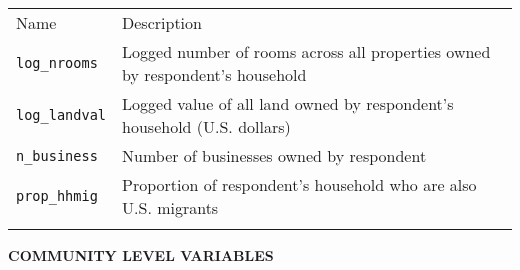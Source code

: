 \documentclass[]{article}
\begin{document}
\begin{longtable}[c]{@{}ll@{}}
\toprule\addlinespace
\begin{minipage}[b]{0.39\columnwidth}\raggedright
Name
\end{minipage} & \begin{minipage}[b]{0.54\columnwidth}\raggedright
Description
\end{minipage}
\\\addlinespace
\midrule\endhead
\begin{minipage}[t]{0.39\columnwidth}\raggedright
\texttt{log\_nrooms}
\end{minipage} & \begin{minipage}[t]{0.54\columnwidth}\raggedright
Logged number of rooms across all properties owned by respondent's
household
\end{minipage}
\\\addlinespace
\begin{minipage}[t]{0.39\columnwidth}\raggedright
\texttt{log\_landval}
\end{minipage} & \begin{minipage}[t]{0.54\columnwidth}\raggedright
Logged value of all land owned by respondent's household (U.S. dollars)
\end{minipage}
\\\addlinespace
\begin{minipage}[t]{0.39\columnwidth}\raggedright
\texttt{n\_business}
\end{minipage} & \begin{minipage}[t]{0.54\columnwidth}\raggedright
Number of businesses owned by respondent
\end{minipage}
\\\addlinespace
\begin{minipage}[t]{0.39\columnwidth}\raggedright
\texttt{prop\_hhmig}
\end{minipage} & \begin{minipage}[t]{0.54\columnwidth}\raggedright
Proportion of respondent's household who are also U.S. migrants
\end{minipage}
\\\addlinespace
\bottomrule
\end{longtable}

\textbf{COMMUNITY LEVEL VARIABLES}
\end{document}
